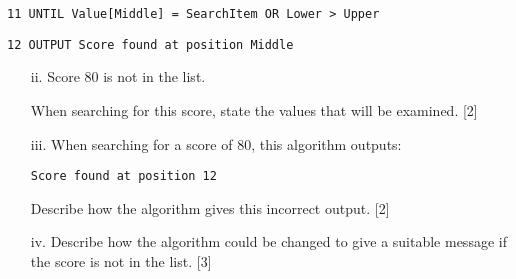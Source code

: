 \begin{enumerate}
\begin{minipage}[t]{1\columnwidth}
\texttt{11 UNTIL Value{[}Middle{]} = SearchItem OR Lower > Upper}

\texttt{12 OUTPUT \textquotedbl Score found at position\textquotedbl{}
Middle}%
\end{minipage}
\begin{enumerate}
\item[ii.] Score 80 is not in the list.

When searching for this score, state the values that will be examined.
\hfill{}{[}2{]}
\item[iii.] When searching for a score of 80, this algorithm outputs:

\texttt{Score found at position 12}

Describe how the algorithm gives this incorrect output. \hfill{}{[}2{]}
\item[iv.] Describe how the algorithm could be changed to give a suitable message
if the score is not in the list. \hfill{}{[}3{]}
\end{enumerate}
\end{enumerate}
